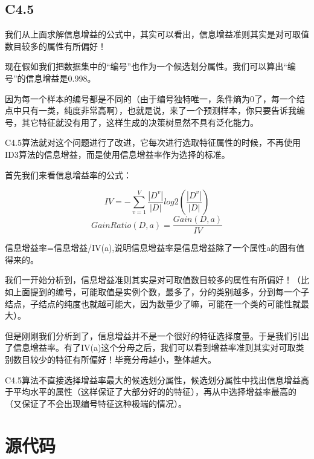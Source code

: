 \documentclass{ML}
\begin{document}
\subsection{C4.5}

我们从上面求解信息增益的公式中，其实可以看出，信息增益准则其实是对可取值数目较多的属性有所偏好！

现在假如我们把数据集中的“编号”也作为一个候选划分属性。我们可以算出“编号”的信息增益是0.998。

因为每一个样本的编号都是不同的（由于编号独特唯一，条件熵为0了，每一个结点中只有一类，纯度非常高啊），也就是说，来了一个预测样本，你只要告诉我编号，其它特征就没有用了，这样生成的决策树显然不具有泛化能力。

C4.5算法就对这个问题进行了改进，它每次进行选取特征属性的时候，不再使用ID3算法的信息增益，而是使用信息增益率作为选择的标准。

首先我们来看信息增益率的公式：

$$IV = - \sum^V_{v=1} \frac{ |D^v| }{ |D| } log2( \frac{ |D^v| }{ |D| })$$
$$GainRatio(D,a) = \frac{ Gain(D,a) }{ IV }$$

信息增益率=信息增益/IV(a),说明信息增益率是信息增益除了一个属性a的固有值得来的。

我们一开始分析到，信息增益准则其实是对可取值数目较多的属性有所偏好！（比如上面提到的编号，可能取值是实例个数，最多了，分的类别越多，分到每一个子结点，子结点的纯度也就越可能大，因为数量少了嘛，可能在一个类的可能性就最大）。

但是刚刚我们分析到了，信息增益并不是一个很好的特征选择度量。于是我们引出了信息增益率。有了IV(a)这个分母之后，我们可以看到增益率准则其实对可取类别数目较少的特征有所偏好！毕竟分母越小，整体越大。

C4.5算法不直接选择增益率最大的候选划分属性，候选划分属性中找出信息增益高于平均水平的属性（这样保证了大部分好的的特征），再从中选择增益率最高的（又保证了不会出现编号特征这种极端的情况）。

\appendix

\section{源代码}

\inputminted[breaklines=true,frame=lines,mathescape=true]{python}{../decision_tree.py}
\end{document}
